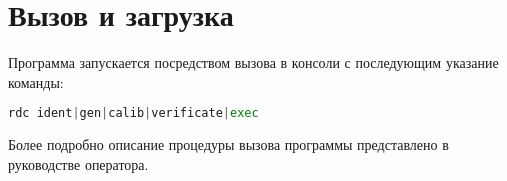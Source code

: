 \newpage
\section{Вызов и загрузка}

Программа запускается посредством вызова в консоли с последующим указание команды:
\begin{lstlisting}[language=python, numbers=none, frame=single]
rdc ident|gen|calib|verificate|exec
\end{lstlisting}
Более подробно описание процедуры вызова программы представлено в руководстве оператора.